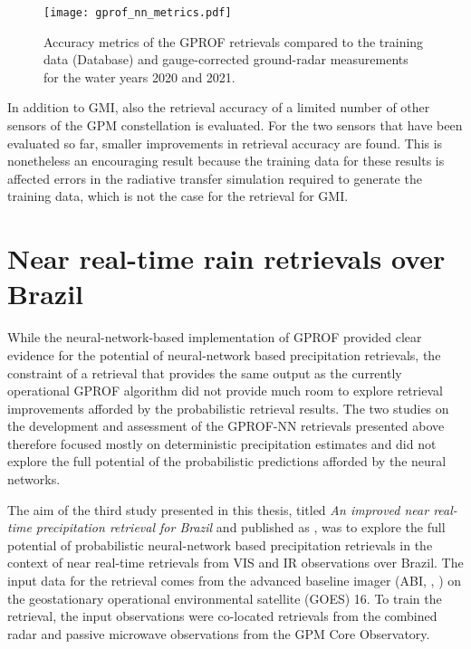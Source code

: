   \begin{figure}[!hbpt]
    \centering
    \texttt{[image: gprof\_nn\_metrics.pdf]}
    \caption{
      Accuracy metrics of the GPROF retrievals compared to the training data
      (Database) and gauge-corrected ground-radar measurements for the water
      years 2020 and 2021.
    }
    \label{fig:error_metrics}
  \end{figure}

In addition to GMI, also the retrieval accuracy of a limited number of other
sensors of the GPM constellation is evaluated. For the two sensors that have
been evaluated so far, smaller improvements in retrieval accuracy are found.
This is nonetheless an encouraging result because the training data for these
results is affected errors in the radiative transfer simulation required to
generate the training data, which is not the case for the retrieval for GMI.


\section{Near real-time rain retrievals over Brazil}

While the neural-network-based implementation of GPROF provided clear evidence
for the potential of neural-network based precipitation retrievals, the
constraint of a retrieval that provides the same output as the currently
operational GPROF algorithm did not provide much room to explore retrieval
improvements afforded by the probabilistic retrieval results. The two studies on
the development and assessment of the GPROF-NN retrievals presented above
therefore focused mostly on deterministic precipitation estimates and did not
explore the full potential of the probabilistic predictions afforded by the
neural networks.

The aim of the third study presented in this thesis, titled \textit{%
  An
  improved near real-time precipitation retrieval for Brazil%
} and published as
  \citet{pfreundschuh22b}, was to explore the full potential of probabilistic
  neural-network based precipitation retrievals in the context of near real-time
  retrievals from VIS and IR observations over Brazil. The input data for the
  retrieval comes from the advanced baseline imager (ABI, \citeauthor{schmit18},
  \citeyear{schmit18}) on the geostationary operational environmental satellite
  (GOES) 16. To train the retrieval, the input observations were co-located
  retrievals from the combined radar and passive microwave observations from the
  GPM Core Observatory.

